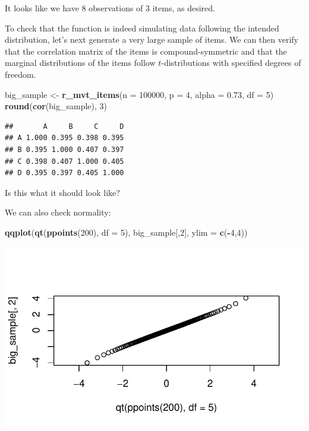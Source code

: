 \documentclass[
]{book}
\newenvironment{Shaded}{\begin{snugshade}}{\end{snugshade}}
\newcommand{\AttributeTok}[1]{\textcolor[rgb]{0.13,0.29,0.53}{#1}}
\newcommand{\DecValTok}[1]{\textcolor[rgb]{0.00,0.00,0.81}{#1}}
\newcommand{\FloatTok}[1]{\textcolor[rgb]{0.00,0.00,0.81}{#1}}
\newcommand{\FunctionTok}[1]{\textcolor[rgb]{0.13,0.29,0.53}{\textbf{#1}}}
\newcommand{\NormalTok}[1]{#1}
\newcommand{\OtherTok}[1]{\textcolor[rgb]{0.56,0.35,0.01}{#1}}
\newcommand{\SpecialCharTok}[1]{\textcolor[rgb]{0.81,0.36,0.00}{\textbf{#1}}}
\begin{document}
It looks like we have 8 observations of 3 items, as desired.

To check that the function is indeed simulating data following the intended distribution, let's next generate a very large sample of items. We can then verify that the correlation matrix of the items is compound-symmetric and that the marginal distributions of the items follow \(t\)-distributions with specified degrees of freedom.

\begin{Shaded}
\begin{Highlighting}[]
\NormalTok{big\_sample }\OtherTok{\textless{}{-}} \FunctionTok{r\_mvt\_items}\NormalTok{(}\AttributeTok{n =} \DecValTok{100000}\NormalTok{, }\AttributeTok{p =} \DecValTok{4}\NormalTok{, }\AttributeTok{alpha =} \FloatTok{0.73}\NormalTok{, }\AttributeTok{df =} \DecValTok{5}\NormalTok{)}
\FunctionTok{round}\NormalTok{(}\FunctionTok{cor}\NormalTok{(big\_sample), }\DecValTok{3}\NormalTok{)}
\end{Highlighting}
\end{Shaded}

\begin{verbatim}
##       A     B     C     D
## A 1.000 0.395 0.398 0.395
## B 0.395 1.000 0.407 0.397
## C 0.398 0.407 1.000 0.405
## D 0.395 0.397 0.405 1.000
\end{verbatim}

Is this what it should look like?

We can also check normality:

\begin{Shaded}
\begin{Highlighting}[]
\FunctionTok{qqplot}\NormalTok{(}\FunctionTok{qt}\NormalTok{(}\FunctionTok{ppoints}\NormalTok{(}\DecValTok{200}\NormalTok{), }\AttributeTok{df =} \DecValTok{5}\NormalTok{), big\_sample[,}\DecValTok{2}\NormalTok{], }\AttributeTok{ylim =} \FunctionTok{c}\NormalTok{(}\SpecialCharTok{{-}}\DecValTok{4}\NormalTok{,}\DecValTok{4}\NormalTok{))}
\end{Highlighting}
\end{Shaded}

\begin{center}\includegraphics[width=0.75\linewidth]{Designing-Simulations-in-R_files/figure-latex/unnamed-chunk-119-1} \end{center}
\end{document}
